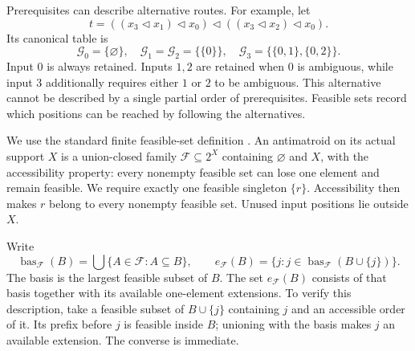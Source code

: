 \documentclass[11pt]{article}
\newcommand{\del}{\mathbin{\triangleleft}}
\newcommand{\bas}{\operatorname{bas}}
\begin{document}
Prerequisites can describe alternative routes. For example, let
\[
 t=((x_3\del x_1)\del x_0)\del((x_3\del x_2)\del x_0).
\]
Its canonical table is
\[
 \mathcal G_0=\{\varnothing\},\quad
 \mathcal G_1=\mathcal G_2=\{\{0\}\},\quad
 \mathcal G_3=\{\{0,1\},\{0,2\}\}.
\]
Input $0$ is always retained. Inputs $1,2$ are retained when $0$ is
ambiguous, while input $3$ additionally requires either $1$ or $2$ to
be ambiguous. This alternative cannot be described by a single
partial order of prerequisites. Feasible sets record which positions
can be reached by following the alternatives.

We use the standard finite feasible-set definition
\cite[Section~7]{Czedli2014}. An antimatroid on its actual support $X$
is a union-closed family $\mathcal F\subseteq2^X$ containing
$\varnothing$ and $X$, with the accessibility property: every nonempty
feasible set can lose one element and remain feasible. We require
exactly one feasible singleton $\{r\}$. Accessibility then makes $r$
belong to every nonempty feasible set. Unused input positions lie
outside $X$.

Write
\[
 \bas_{\mathcal F}(B)=\bigcup\{A\in\mathcal F:A\subseteq B\},\qquad
 e_{\mathcal F}(B)=\{j:j\in\bas_{\mathcal F}(B\cup\{j\})\}.
\]
The basis is the largest feasible subset of $B$. The set $e_{\mathcal F}(B)$
consists of that basis together with its available one-element
extensions. To verify this description, take a feasible subset of
$B\cup\{j\}$ containing $j$ and an accessible order of it. Its prefix
before $j$ is feasible inside $B$; unioning with the basis makes $j$
an available extension. The converse is immediate.
\end{document}
